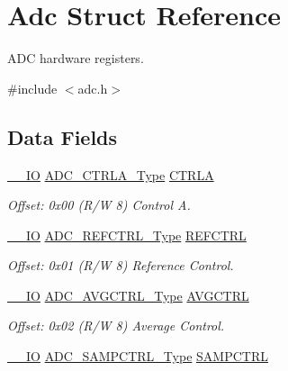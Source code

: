 \hypertarget{struct_adc}{}\section{Adc Struct Reference}
\label{struct_adc}


A\+DC hardware registers.  




{\ttfamily \#include $<$adc.\+h$>$}

\subsection*{Data Fields}
\begin{DoxyCompactItemize}
\item 
\mbox{\hyperlink{core__cm0plus_8h_aec43007d9998a0a0e01faede4133d6be}{\+\_\+\+\_\+\+IO}} \mbox{\hyperlink{union_a_d_c___c_t_r_l_a___type}{A\+D\+C\+\_\+\+C\+T\+R\+L\+A\+\_\+\+Type}} \mbox{\hyperlink{struct_adc_aedbf581af41a7981837f2d6f95ceee4c}{C\+T\+R\+LA}}
\begin{DoxyCompactList}\small\item\em Offset\+: 0x00 (R/W 8) Control A. \end{DoxyCompactList}\item 
\mbox{\hyperlink{core__cm0plus_8h_aec43007d9998a0a0e01faede4133d6be}{\+\_\+\+\_\+\+IO}} \mbox{\hyperlink{union_a_d_c___r_e_f_c_t_r_l___type}{A\+D\+C\+\_\+\+R\+E\+F\+C\+T\+R\+L\+\_\+\+Type}} \mbox{\hyperlink{struct_adc_a875aa333f294147bbd96345fb59a9a64}{R\+E\+F\+C\+T\+RL}}
\begin{DoxyCompactList}\small\item\em Offset\+: 0x01 (R/W 8) Reference Control. \end{DoxyCompactList}\item 
\mbox{\hyperlink{core__cm0plus_8h_aec43007d9998a0a0e01faede4133d6be}{\+\_\+\+\_\+\+IO}} \mbox{\hyperlink{union_a_d_c___a_v_g_c_t_r_l___type}{A\+D\+C\+\_\+\+A\+V\+G\+C\+T\+R\+L\+\_\+\+Type}} \mbox{\hyperlink{struct_adc_aac8d5b49ae8002fcd0e6bf0330319ad7}{A\+V\+G\+C\+T\+RL}}
\begin{DoxyCompactList}\small\item\em Offset\+: 0x02 (R/W 8) Average Control. \end{DoxyCompactList}\item 
\mbox{\hyperlink{core__cm0plus_8h_aec43007d9998a0a0e01faede4133d6be}{\+\_\+\+\_\+\+IO}} \mbox{\hyperlink{union_a_d_c___s_a_m_p_c_t_r_l___type}{A\+D\+C\+\_\+\+S\+A\+M\+P\+C\+T\+R\+L\+\_\+\+Type}} \mbox{\hyperlink{struct_adc_ab4d44269a58c94c652f134197f428c95}{S\+A\+M\+P\+C\+T\+RL}}

\end{DoxyCompactItemize}
